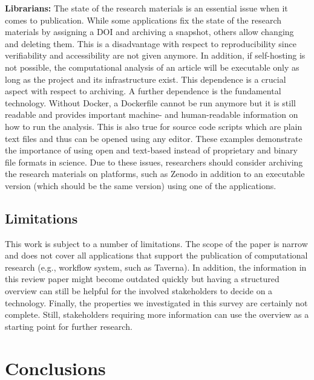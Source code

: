 \documentclass[onecolumn]{article}
\begin{document}
\textbf{Librarians:} The state of the research materials is an essential
issue when it comes to publication. While some applications fix the
state of the research materials by assigning a DOI and archiving a
snapshot, others allow changing and deleting them. This is a
disadvantage with respect to reproducibility since verifiability and
accessibility are not given anymore. In addition, if self-hosting is not
possible, the computational analysis of an article will be executable
only as long as the project and its infrastructure exist. This
dependence is a crucial aspect with respect to archiving. A further
dependence is the fundamental technology. Without Docker, a Dockerfile
cannot be run anymore but it is still readable and provides important
machine- and human-readable information on how to run the analysis. This
is also true for source code scripts which are plain text files and thus
can be opened using any editor. These examples demonstrate the
importance of using open and text-based instead of proprietary and
binary file formats in science. Due to these issues, researchers should
consider archiving the research materials on platforms, such as Zenodo
in addition to an executable version (which should be the same version)
using one of the applications.

\hypertarget{limitations}{%
\subsection{Limitations}\label{limitations}}

This work is subject to a number of limitations. The scope of the paper
is narrow and does not cover all applications that support the
publication of computational research (e.g., workflow system, such as
Taverna). In addition, the information in this review paper might become
outdated quickly but having a structured overview can still be helpful
for the involved stakeholders to decide on a technology. Finally, the
properties we investigated in this survey are certainly not complete.
Still, stakeholders requiring more information can use the overview as a
starting point for further research.

\hypertarget{conclusions}{%
\section{Conclusions}\label{conclusions}}
\end{document}
